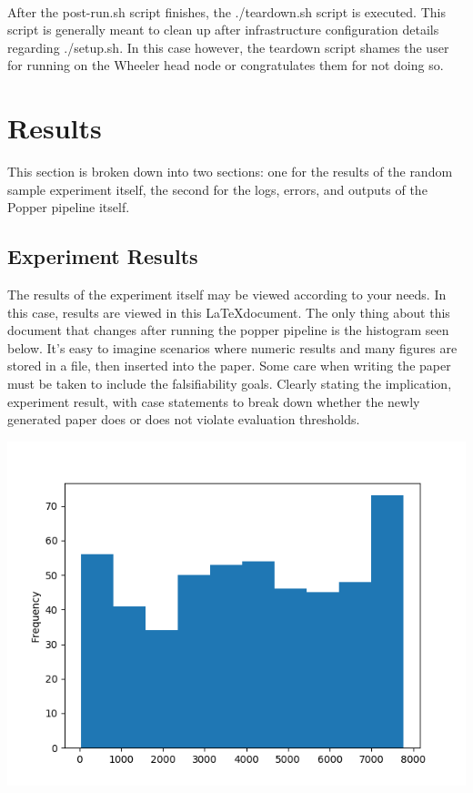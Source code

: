 \documentclass[12pt]{article}
\begin{document}
\paragraph{}
After the post-run.sh script finishes, the ./teardown.sh script is executed. This script is generally meant to clean up after infrastructure configuration details regarding ./setup.sh. In this case however, the teardown script shames the user for running on the Wheeler head node or congratulates them for not doing so.
\section*{Results}
This section is broken down into two sections: one for the results of the random sample experiment itself,  the second for the logs, errors, and outputs of the Popper pipeline itself.
\subsection*{Experiment Results}
The results of the experiment itself may be viewed according to your needs. In this case, results are viewed in this \LaTeX document. The only thing about this document that changes after running the popper pipeline is the histogram seen below. It's easy to imagine scenarios where numeric results and many figures are stored in a file, then inserted into the paper. Some care when writing the paper must be taken to include the falsifiability goals. Clearly stating the implication, experiment result, with case statements to break down whether the newly generated paper does or does not violate evaluation thresholds.

\begin{center}
\includegraphics[scale=0.5]{../all_sample_hist.png} 
\end{center}
\end{document}
